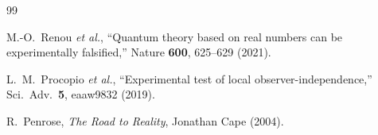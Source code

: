 \documentclass[12pt,a4paper]{article}
\theoremstyle{definition}
\theoremstyle{remark}
\begin{document}
\begin{thebibliography}{99}

M.-O.~Renou \textit{et al.}, ``Quantum theory based on real
numbers can be experimentally falsified,'' Nature
\textbf{600}, 625--629 (2021).

L.~M.~Procopio \textit{et al.}, ``Experimental test of local
observer-independence,'' Sci.\ Adv.\ \textbf{5}, eaaw9832
(2019).

R.~Penrose, \emph{The Road to Reality}, Jonathan Cape (2004).

\end{thebibliography}
\end{document}
